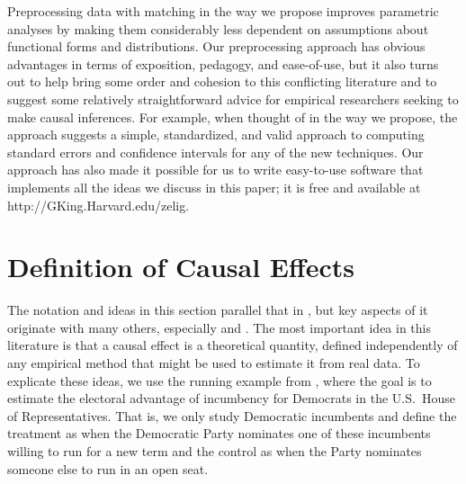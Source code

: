 \documentclass[11pt,titlepage]{article}
\begin{document}
Preprocessing data with matching in the way we propose improves
parametric analyses by making them considerably less dependent on
assumptions about functional forms and distributions.  Our
preprocessing approach has obvious advantages in terms of exposition,
pedagogy, and ease-of-use, but it also turns out to help bring some
order and cohesion to this conflicting literature and to suggest some
relatively straightforward advice for empirical researchers seeking to
make causal inferences.  For example, when thought of in the way we
propose, the approach suggests a simple, standardized, and valid
approach to computing standard errors and confidence intervals for any
of the new techniques.  Our approach has also made it possible for us
to write easy-to-use software that implements all the ideas we discuss
in this paper; it is free and available at
http://GKing.Harvard.edu/zelig.

\section{Definition of Causal Effects}

The notation and ideas in this section parallel that in
\citet[][Section 3.1.1]{KinKeoVer94}, but key aspects of it originate
with many others, especially \citet{Rubin74} and \citet{Holland86}.
The most important idea in this literature is that a causal effect is
a theoretical quantity, defined independently of any empirical method
that might be used to estimate it from real data.  To explicate these
ideas, we use the running example from \citet[][Section
3.1.1]{KinKeoVer94}, where the goal is to estimate the electoral
advantage of incumbency for Democrats in the U.S.\ House of
Representatives.  That is, we only study Democratic incumbents and
define the treatment as when the Democratic Party nominates one of
these incumbents willing to run for a new term and the control as when
the Party nominates someone else to run in an open seat.
\end{document}
